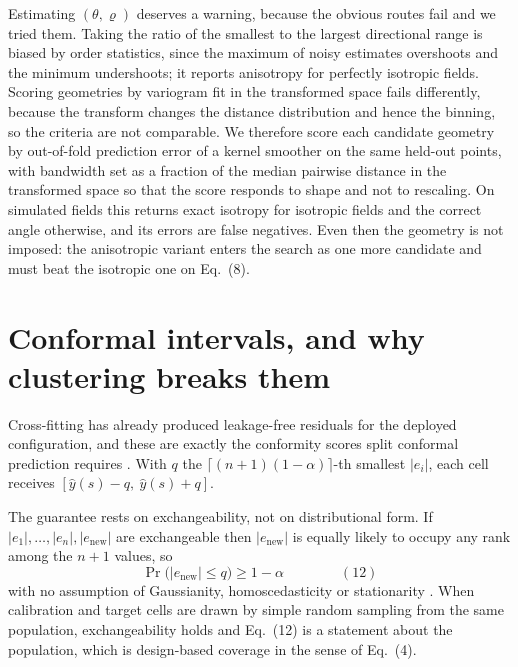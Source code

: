 \documentclass[preprint,12pt,authoryear]{elsarticle}
\newcommand{\eqnum}[1]{\qquad\qquad\mathrm{(#1)}}
\begin{document}
Estimating $(\theta,\varrho)$ deserves a warning, because the obvious routes
fail and we tried them. Taking the ratio of the smallest to the largest
directional range is biased by order statistics, since the maximum of noisy
estimates overshoots and the minimum undershoots; it reports anisotropy for
perfectly isotropic fields. Scoring geometries by variogram fit in the
transformed space fails differently, because the transform changes the distance
distribution and hence the binning, so the criteria are not comparable. We
therefore score each candidate geometry by out-of-fold prediction error of a
kernel smoother on the same held-out points, with bandwidth set as a fraction of
the median pairwise distance in the transformed space so that the score responds
to shape and not to rescaling. On simulated fields this returns exact isotropy
for isotropic fields and the correct angle otherwise, and its errors are false
negatives. Even then the geometry is not imposed: the anisotropic variant enters
the search as one more candidate and must beat the isotropic one on Eq.~(8).

\section{Conformal intervals, and why clustering breaks them}
\label{sec:intervals}

Cross-fitting has already produced leakage-free residuals for the deployed
configuration, and these are exactly the conformity scores split conformal
prediction requires \citep{papadopoulos2002,vovk2005,lei2018}. With $q$ the
$\lceil (n+1)(1-\alpha)\rceil$-th smallest $|e_i|$, each cell receives
$[\hat y(s)-q,\ \hat y(s)+q]$.

The guarantee rests on exchangeability, not on distributional form. If
$|e_1|,\dots,|e_n|,|e_{\mathrm{new}}|$ are exchangeable then $|e_{\mathrm{new}}|$
is equally likely to occupy any rank among the $n+1$ values, so
\[
\Pr\big(|e_{\mathrm{new}}| \le q\big) \ge 1-\alpha
\eqnum{12}
\]
with no assumption of Gaussianity, homoscedasticity or stationarity
\citep{vovk2005}. When calibration and target cells are drawn by simple random
sampling from the same population, exchangeability holds and Eq.~(12) is a
statement about the population, which is design-based coverage in the sense of
Eq.~(4).
\end{document}
